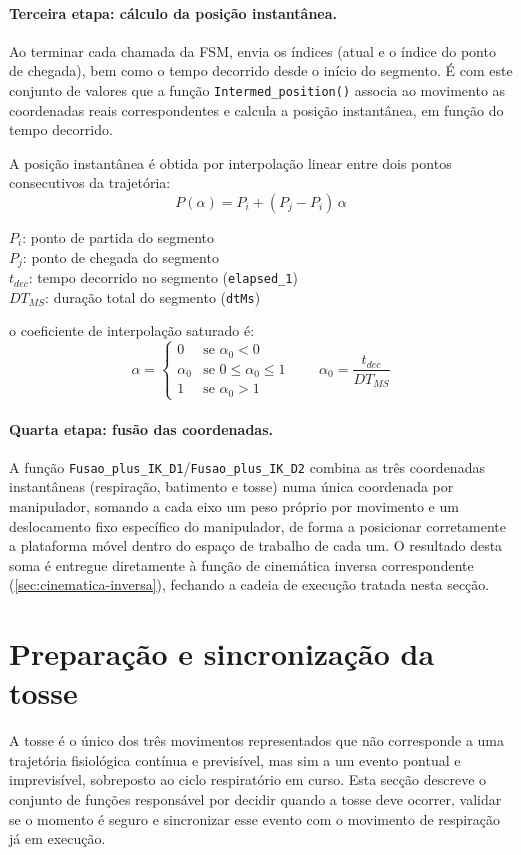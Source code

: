 \paragraph{Terceira etapa: cálculo da posição instantânea.}
Ao terminar cada chamada da FSM, envia os índices (atual e o índice do ponto de chegada), bem como o tempo decorrido desde o início do segmento. É com este conjunto de valores que a função \texttt{Intermed\_position()} associa ao movimento as coordenadas reais correspondentes e calcula a posição instantânea, em função do tempo decorrido.

\begin{samepage}
A posição instantânea é obtida por interpolação linear entre dois pontos consecutivos da trajetória:
\[
  P(\alpha) = P_i + (P_j - P_i)\,\alpha
\]
{\footnotesize
\noindent
\(P_i\): ponto de partida do segmento\\
\(P_j\): ponto de chegada do segmento\\
\(t_{dec}\): tempo decorrido no segmento (\texttt{elapsed\_1})\\
\(DT_{MS}\): duração total do segmento (\texttt{dtMs})
\par}
\vspace{4pt}
\noindent o coeficiente de interpolação saturado é:
\[
  \alpha = \begin{cases}
    0        & \text{se } \alpha_0 < 0 \\
    \alpha_0 & \text{se } 0 \le \alpha_0 \le 1 \\
    1        & \text{se } \alpha_0 > 1
  \end{cases}
  \qquad \alpha_0 = \frac{t_{dec}}{DT_{MS}}
\]
\end{samepage}

\paragraph{Quarta etapa: fusão das coordenadas.}
A função \texttt{Fusao\_plus\_IK\_D1}/\texttt{Fusao\_plus\_IK\_D2} combina as três coordenadas instantâneas (respiração, batimento e tosse) numa única coordenada por manipulador, somando a cada eixo um peso próprio por movimento e um deslocamento fixo específico do manipulador, de forma a posicionar corretamente a plataforma móvel dentro do espaço de trabalho de cada um. O resultado desta soma é entregue diretamente à função de cinemática inversa correspondente (\cref{sec:cinematica-inversa}), fechando a cadeia de execução tratada nesta secção.

\section{Preparação e sincronização da tosse}
A tosse é o único dos três movimentos representados que não corresponde a uma trajetória fisiológica contínua e previsível, mas sim a um evento pontual e imprevisível, sobreposto ao ciclo respiratório em curso. Esta secção descreve o conjunto de funções responsável por decidir quando a tosse deve ocorrer, validar se o momento é seguro e sincronizar esse evento com o movimento de respiração já em execução.

